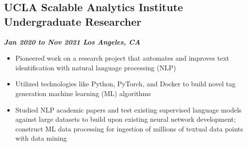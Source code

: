 \documentclass[10pt]{article}
\begin{document}
\begin{raggedright}
        \subsection*{\textbf{\large{UCLA Scalable Analytics Institute \textendash{} Undergraduate Researcher}}} \hfill \textbf{\textit{Jan 2020 to Nov 2021 \textendash{} Los Angeles, CA}}
        \begin{itemize}
            \item Pioneered work on a research project that automates and improves text identification with natural language processing (NLP)
            \item Utilized technologies like Python, PyTorch, and Docker to build novel tag generation machine learning (ML) algorithms
            \item Studied NLP academic papers and test existing supervised language models against large datasets to build upon existing neural network development; construct ML data processing for ingestion of millions of textual data points with data mining
        \end{itemize}

    \end{raggedright}
\end{document}
